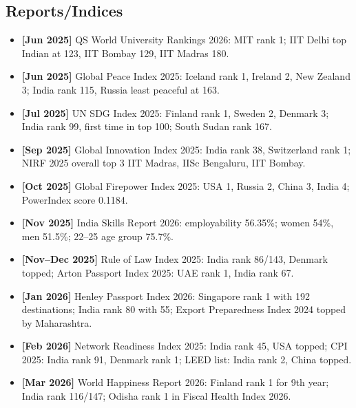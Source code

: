 \documentclass[10pt,a4paper]{article}
\newcommand{\monthtag}[1]{\textbf{[#1]}}
\newcommand{\fact}[2]{\item \monthtag{#1} #2}
\begin{document}
\subsection{Reports/Indices}
\begin{itemize}
    \fact{Jun 2025}{QS World University Rankings 2026: MIT rank 1; IIT Delhi top Indian at 123, IIT Bombay 129, IIT Madras 180.}
    \fact{Jun 2025}{Global Peace Index 2025: Iceland rank 1, Ireland 2, New Zealand 3; India rank 115, Russia least peaceful at 163.}
    \fact{Jul 2025}{UN SDG Index 2025: Finland rank 1, Sweden 2, Denmark 3; India rank 99, first time in top 100; South Sudan rank 167.}
    \fact{Sep 2025}{Global Innovation Index 2025: India rank 38, Switzerland rank 1; NIRF 2025 overall top 3 IIT Madras, IISc Bengaluru, IIT Bombay.}
    \fact{Oct 2025}{Global Firepower Index 2025: USA 1, Russia 2, China 3, India 4; PowerIndex score 0.1184.}
    \fact{Nov 2025}{India Skills Report 2026: employability 56.35\%; women 54\%, men 51.5\%; 22--25 age group 75.7\%.}
    \fact{Nov--Dec 2025}{Rule of Law Index 2025: India rank 86/143, Denmark topped; Arton Passport Index 2025: UAE rank 1, India rank 67.}
    \fact{Jan 2026}{Henley Passport Index 2026: Singapore rank 1 with 192 destinations; India rank 80 with 55; Export Preparedness Index 2024 topped by Maharashtra.}
    \fact{Feb 2026}{Network Readiness Index 2025: India rank 45, USA topped; CPI 2025: India rank 91, Denmark rank 1; LEED list: India rank 2, China topped.}
    \fact{Mar 2026}{World Happiness Report 2026: Finland rank 1 for 9th year; India rank 116/147; Odisha rank 1 in Fiscal Health Index 2026.}
\end{itemize}
\end{document}
